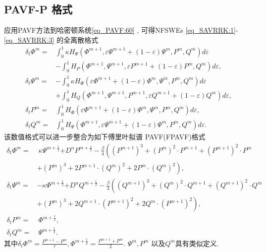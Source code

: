 \subsection{PAVF-P 格式}
应用PAVF方法到哈密顿系统\eqref{eq_PAVF:60} , 可得NFSWEs \eqref{eq_SAVRRK:1}-\eqref{eq_SAVRRK:3} 的全离散格式
\begin{align}
\delta_{t} \varPhi^{m}=&\int_{0}^{1}\kappa H_{\Psi}\left(\varPhi^{m+1} , \varepsilon \Psi^{m+1}+(1-\varepsilon) \Psi^{m} , P^{m} , Q^{m}\right)d \varepsilon\nonumber\\
&-\int_{0}^{1}H_{P}\left(\varPhi^{m+1} , \Psi^{m+1} , \varepsilon P^{m+1}+(1-\varepsilon) P^{m} , Q^{m}\right)d \varepsilon , \label{eq_PAVF:70}\\
\delta_{t} \Psi^{m}=&-\int_{0}^{1}\kappa H_{\varPhi}\left(\varepsilon \varPhi^{m+1}+(1-\varepsilon) \varPhi^{m} , \Psi^{m} , P^{m} , Q^{m}\right)d \varepsilon\nonumber\\
&+\int_{0}^{1}H_{Q}\left(\varPhi^{m+1} , \Psi^{m+1} , P^{m+1} , \varepsilon Q^{m+1}+(1-\varepsilon) Q^{m}\right)d\varepsilon , \label{eq_PAVF:71}\\
\delta_{t} P^{m}=&\int_{0}^{1}H_{\varPhi}\left(\varepsilon \varPhi^{m+1}+(1-\varepsilon) \varPhi^{m} , \Psi^{m} , P^{m} , Q^{m}\right) d \varepsilon , \label{eq_PAVF:72}\\
\delta_{t} Q^{m}=&\int_{0}^{1}H_{\Psi}\left(\varPhi^{m+1} , \varepsilon \Psi^{m+1}+(1-\varepsilon) \Psi^{m} , P^{m} , Q^{m}\right) d \varepsilon . \label{eq_PAVF:73}
\end{align}
该数值格式可以进一步整合为如下傅里叶拟谱 PAVF(FPAVF)格式
\begin{align}
\delta_{t} \varPhi^{m}=&~\kappa \Psi^{m+\frac{1}{2}}{+D^{\alpha} P^{m+\frac{1}{2}}}-\frac{\beta}{4}\left( (P^{m+1})^3+ (P^{m})^{2}\cdot P^{m+1}+(P^{m+1})^{2}\cdot P^{m}\right . \nonumber\\
	&+\left . (P^{m})^{3}+2 P^{m+1}\cdot (Q^{m})^{2}+2 P^{m}\cdot (Q^{m})^{2}\right) , \label{eq_PAVF:74}\\
\delta_{t} \Psi^{m}=&-\kappa \varPhi^{m+\frac{1}{2}}{+D^{\alpha} Q^{m+\frac{1}{2}}}-\frac{\beta}{4}\left( (Q^{m+1})^3+ (Q^{m})^{2}\cdot Q^{m+1}+(Q^{m+1})^{2}\cdot Q^{m}\right . \nonumber\\
	&+\left . (P^{m})^{3}+2 Q^{m+1}\cdot (P^{m+1})^{2}+2 Q^{m}\cdot (P^{m+1})^{2}\right) , \label{eq_PAVF:75}\\
\delta_{t} P^{m}=&~\varPhi^{m+\frac{1}{2}} , \label{eq_PAVF:76}\\
\delta_{t} Q^{m}=&~\Psi^{m+\frac{1}{2}} . \label{eq_PAVF:77}
\end{align}
其中$\delta_{t} \varPhi^{m} = \frac{P^{m+1}-P^{m}}{\tau}, \varPhi^{m+\frac{1}{2}} = \frac{P^{m+1}+P^{m}}{2}$. $\Psi^{m}, P^{m}$ 以及$Q^{m}$具有类似定义.

